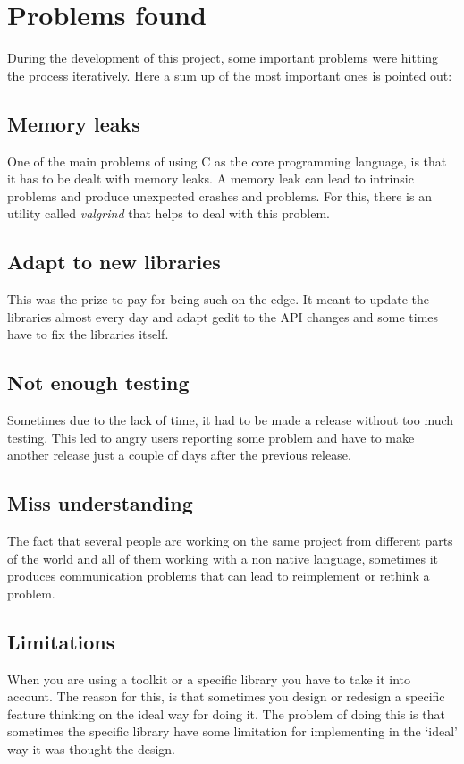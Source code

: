 
\chapter{Problems found}

During the development of this project, some important problems were hitting the process iteratively. Here a sum up of the most important ones is pointed out:

\section*{Memory leaks}

One of the main problems of using C as the core programming language, is that it has to be dealt with memory leaks. A memory leak can lead to intrinsic problems and produce unexpected crashes and problems. For this, there is an utility called \emph{valgrind} that helps to deal with this problem.

\section*{Adapt to new libraries}

This was the prize to pay for being such on the edge. It meant to update the libraries almost every day and adapt gedit to the API changes and some times have to fix the libraries itself.

\section*{Not enough testing}

Sometimes due to the lack of time, it had to be made a release without too much testing. This led to angry users reporting some problem and have to make another release just a couple of days after the previous release.

\section*{Miss understanding}

The fact that several people are working on the same project from different parts of the world and all of them working with a non native language, sometimes it produces communication problems that can lead to reimplement or rethink a problem.

\section*{Limitations}

When you are using a toolkit or a specific library you have to take it into account. The reason for this, is that sometimes you design or redesign a specific feature thinking on the ideal way for doing it. The problem of doing this is that sometimes the specific library have some limitation for implementing in the `ideal' way it was thought the design.
